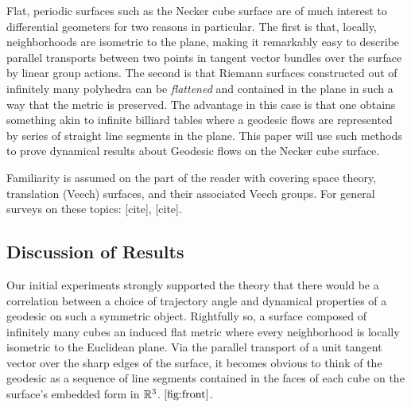 \documentclass[]{article}
\begin{document}
Flat, periodic surfaces such as the Necker cube surface are of much interest to differential geometers for two reasons in particular. The first is that, locally, neighborhoods are isometric to the plane, making it remarkably easy to describe parallel transports between two points in tangent vector bundles over the surface by linear group actions. The second is that Riemann surfaces constructed out of infinitely many polyhedra can be \emph{flattened} and contained in the plane in such a way that the metric is preserved. The advantage in this case is that one obtains something akin to infinite billiard tables where a geodesic flows are represented by series of straight line segments in the plane. This paper will use such methods to prove dynamical results about Geodesic flows on the Necker cube surface.

\begin{rem}
Familiarity is assumed on the part of the reader with covering space theory, translation (Veech) surfaces, and their associated Veech groups. For general surveys on these topics: [cite], [cite].
\end{rem}

\subsection{Discussion of Results}
Our initial experiments strongly supported the theory that there would be a correlation between a choice of trajectory angle and dynamical properties of a geodesic on such a symmetric object. Rightfully so, a surface composed of infinitely many cubes an induced flat metric where every neighborhood is locally isometric to the Euclidean plane. Via the parallel transport of a unit tangent vector over the sharp edges of the surface, it becomes obvious to think of the geodesic as a sequence of line segments contained in the faces of each cube on the surface's embedded form in $\mathbb{R}^3$. $\ref{fig:front}$.
\end{document}
